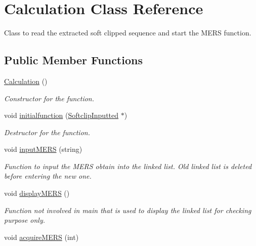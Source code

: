 \hypertarget{class_calculation}{\section{Calculation Class Reference}
\label{class_calculation}
}


Class to read the extracted soft clipped sequence and start the M\+E\+R\+S function.  


\subsection*{Public Member Functions}
\begin{DoxyCompactItemize}
\item 
\hypertarget{class_calculation_ac643a00260d868a483b0967b0f81b9b6}{\hyperlink{class_calculation_ac643a00260d868a483b0967b0f81b9b6}{Calculation} ()}\label{class_calculation_ac643a00260d868a483b0967b0f81b9b6}

\begin{DoxyCompactList}\small\item\em Constructor for the function. \end{DoxyCompactList}\item 
void \hyperlink{class_calculation_a6f9e51d9bc8b04fd9ff2455614bd7fc8}{initialfunction} (\hyperlink{struct_softclip_inputted}{Softclip\+Inputted} $\ast$)
\begin{DoxyCompactList}\small\item\em Destructor for the function. \end{DoxyCompactList}\item 
\hypertarget{class_calculation_a21b7c230ad940da9f7183af5dca6e446}{void \hyperlink{class_calculation_a21b7c230ad940da9f7183af5dca6e446}{input\+M\+E\+R\+S} (string)}\label{class_calculation_a21b7c230ad940da9f7183af5dca6e446}

\begin{DoxyCompactList}\small\item\em Function to input the M\+E\+R\+S obtain into the linked list. Old linked list is deleted before entering the new one. \end{DoxyCompactList}\item 
\hypertarget{class_calculation_ad9034c3389ef6b83dd5562e0dd08a167}{void \hyperlink{class_calculation_ad9034c3389ef6b83dd5562e0dd08a167}{display\+M\+E\+R\+S} ()}\label{class_calculation_ad9034c3389ef6b83dd5562e0dd08a167}

\begin{DoxyCompactList}\small\item\em Function not involved in main that is used to display the linked list for checking purpose only. \end{DoxyCompactList}\item 
\hypertarget{class_calculation_a794fc2ed13f83130f6b745ade6e68150}{void \hyperlink{class_calculation_a794fc2ed13f83130f6b745ade6e68150}{acquire\+M\+E\+R\+S} (int)}\label{class_calculation_a794fc2ed13f83130f6b745ade6e68150}


\end{DoxyCompactItemize}

